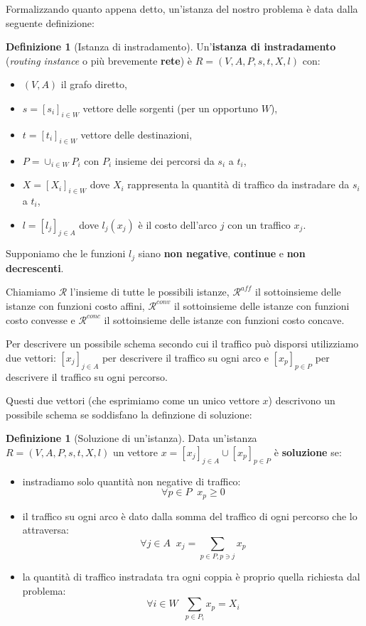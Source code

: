 \documentclass[a4paper]{article}
\theoremstyle{plain}
\theoremstyle{definition}
\newtheorem{mydef}[myteo]{Definizione}
\theoremstyle{remark}
\newcommand{\bra}[1]{\left[#1\right]}
\begin{document}
Formalizzando quanto appena detto, un'istanza del nostro problema è
data dalla seguente definizione:

\begin{mydef}[Istanza di instradamento]
  Un'\textbf{istanza di instradamento} (\textit{routing instance} o
  più brevemente \textbf{rete}) è $R=(V,A,P,s,t,X,l)$ con:
  \begin{itemize}
  \item $(V,A)$ il grafo diretto,
  \item $s = \bra{s_i}_{i\in W}$ vettore delle sorgenti (per un opportuno $W$),
  \item $t = \bra{t_i}_{i\in W}$ vettore delle destinazioni,
  \item $P = \cup _{i\in W} P_i$ con $P_i$ insieme dei
    percorsi da $s_i$ a $t_i$,
  \item $X = \bra{X_i}_{i\in W}$ dove $X_i$ rappresenta la quantità di
    traffico da instradare da $s_i$ a $t_i$,
  \item $l = \bra{l_j}_{j\in A}$ dove $l_j(x_j)$ è il costo dell'arco
    $j$ con un traffico $x_j$.
  \end{itemize}
  Supponiamo che le funzioni $l_j$ siano \textbf{non negative},
  \textbf{continue} e \textbf{non decrescenti}.
\end{mydef}

Chiamiamo $\mathcal{R}$ l'insieme di tutte le possibili istanze,
$\mathcal{R}^{aff}$ il sottoinsieme delle istanze con funzioni costo
affini, $\mathcal{R}^{conv}$ il sottoinsieme delle istanze con funzioni costo
convesse e $\mathcal{R}^{conc}$ il sottoinsieme delle istanze con
funzioni costo concave.

Per descrivere un possibile schema secondo cui il traffico può
disporsi utilizziamo due vettori: $\bra{x_j}_{j\in A}$ per descrivere
il traffico su ogni arco e $\bra{x_p}_{p\in P}$ per descrivere il
traffico su ogni percorso.

Questi due vettori (che esprimiamo come un unico vettore $x$)
descrivono un possibile schema se soddisfano la definzione di soluzione:

\begin{mydef}[Soluzione di un'istanza]
  Data un'istanza $R=(V,A,P,s,t,X,l)$ un vettore
  $x = \bra{x_j}_{j\in A} \cup \bra{x_p}_{p\in P}$ è \textbf{soluzione} se:
  \begin{itemize}
  \item instradiamo solo quantità non negative di traffico: \[ \forall p\in P\;\; x_p \ge 0\]
  \item il traffico su ogni arco è dato dalla somma del traffico di
    ogni percorso che lo attraversa: \[ \forall j\in A\;\; x_j = \sum_{p\in P,p\ni j} x_p\]
  \item la quantità di traffico instradata tra ogni coppia è proprio
    quella richiesta dal problema: \[\forall i\in W\;\; \sum_{p\in P_i} x_p = X_i\]
  \end{itemize}
\end{mydef}
\end{document}

